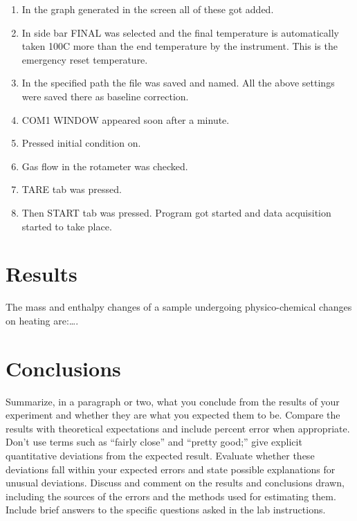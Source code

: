 \documentclass[11pt, a4paper]{article}
\begin{document}
\begin{enumerate}
	\item In the graph generated in the screen all of these got added.
	\item In side bar FINAL was selected and the final temperature is automatically
	taken 100C more than the end temperature by the instrument. This is the
	emergency reset temperature.
	\item In the specified path the file was saved and named. All the above   
	settings were saved there as baseline correction.
	\item COM1 WINDOW appeared soon after a minute.
	\item Pressed initial condition on.
	\item Gas flow in the rotameter was checked.
	\item TARE tab was pressed.
	\item Then START tab was pressed. Program got started and data acquisition started
	to take place. 
\end{enumerate}

\section{Results}
The mass and enthalpy changes of a sample undergoing physico-chemical changes on heating are:\ldots.

\section{Conclusions}
Summarize, in a paragraph or two, what you conclude from the results of your experiment and whether they are what you expected them to be. Compare the results with theoretical expectations and include percent error when appropriate. Don't use terms such as ``fairly close'' and ``pretty good;'' give explicit quantitative deviations from the expected result. Evaluate whether these deviations fall within your expected errors and state possible explanations for unusual deviations. Discuss and comment on the results and conclusions drawn, including the sources of the errors and the methods used for estimating them. Include brief answers to the specific questions asked in the lab instructions.


 
	
	
\end{document}
